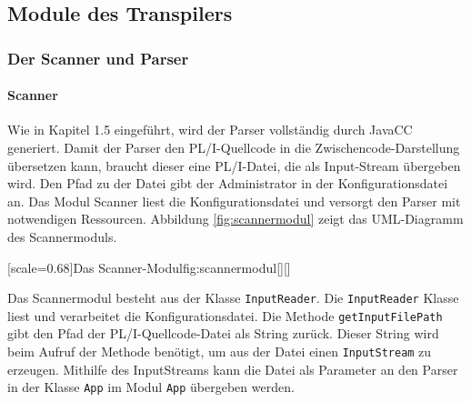  \pagebreak
\subsection{Module des Transpilers}

\subsubsection{Der Scanner und Parser}
\paragraph*{Scanner}
Wie in Kapitel 1.5 eingeführt, wird der Parser vollständig durch 
JavaCC generiert. Damit der Parser den PL/I-Quellcode in die Zwischencode-Darstellung übersetzen kann,
braucht dieser eine PL/I-Datei, die als Input-Stream übergeben wird.
Den Pfad zu der Datei gibt der Administrator in der Konfigurationsdatei an.
Das Modul Scanner liest die Konfigurationsdatei und versorgt den Parser mit notwendigen Ressourcen.
Abbildung \ref{fig:scannermodul} zeigt das UML-Diagramm des Scannermoduls.

[scale=0.68]{Das Scanner-Modul}{fig:scannermodul}[][]

Das Scannermodul besteht aus der Klasse \verb+InputReader+. 
Die \verb+InputReader+ Klasse liest und verarbeitet die Konfigurationsdatei. Die Methode \verb+getInputFilePath+ gibt den Pfad der PL/I-Quellcode-Datei als String zurück.
Dieser String wird beim Aufruf der  Methode benötigt, um aus der Datei einen \verb+InputStream+ zu erzeugen.
Mithilfe des InputStreams kann die Datei als Parameter an den Parser in der Klasse \verb+App+ im Modul \verb+App+
übergeben werden. 

